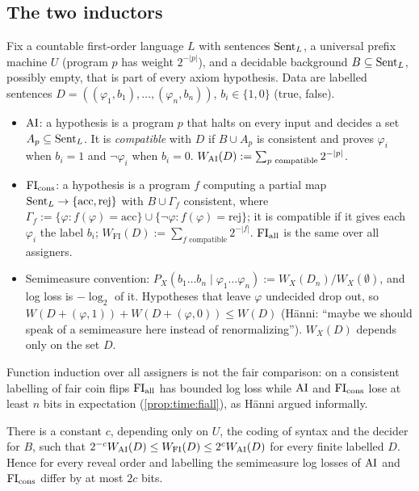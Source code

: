 \subsection{The two inductors}\label{sec:time:inducers}

Fix a countable first-order language $L$ with sentences $\mathrm{Sent}_L$, a universal prefix machine $U$ (program $p$ has weight $2^{-|p|}$), and a decidable background $B\subseteq\mathrm{Sent}_L$, possibly empty, that is part of every axiom hypothesis. Data are labelled sentences $D=((\varphi_1,b_1),\dots,(\varphi_n,b_n))$, $b_i\in\{1,0\}$ (true, false).

\begin{definition}\label{def:time:inducers}
\begin{itemize}[leftmargin=*,itemsep=1pt]
\item $\mathrm{AI}$: a hypothesis is a program $p$ that halts on every input and decides a set $A_p\subseteq\mathrm{Sent}_L$. It is \emph{compatible} with $D$ if $B\cup A_p$ is consistent and proves $\varphi_i$ when $b_i=1$ and $\neg\varphi_i$ when $b_i=0$. $W_{\mathrm{AI}}(D):=\sum_{p\text{ compatible}}2^{-|p|}$.
\item $\mathrm{FI}_{\mathrm{cons}}$: a hypothesis is a program $f$ computing a partial map $\mathrm{Sent}_L\to\{\mathrm{acc},\mathrm{rej}\}$ with $B\cup\Gamma_f$ consistent, where $\Gamma_f:=\{\varphi:f(\varphi)=\mathrm{acc}\}\cup\{\neg\varphi:f(\varphi)=\mathrm{rej}\}$; it is compatible if it gives each $\varphi_i$ the label $b_i$; $W_{\mathrm{FI}}(D):=\sum_{f\text{ compatible}}2^{-|f|}$. $\mathrm{FI}_{\mathrm{all}}$ is the same over all assigners.
\item Semimeasure convention: $P_X(b_1\dots b_n\mid\varphi_1\dots\varphi_n):=W_X(D_n)/W_X(\emptyset)$, and log loss is $-\log_2$ of it. Hypotheses that leave $\varphi$ undecided drop out, so $W(D+(\varphi,1))+W(D+(\varphi,0))\le W(D)$ (H\"anni: ``maybe we should speak of a semimeasure here instead of renormalizing''). $W_X(D)$ depends only on the set $D$.
\end{itemize}
\end{definition}

\noindent Function induction over all assigners is not the fair comparison: on a consistent labelling of fair coin flips $\mathrm{FI}_{\mathrm{all}}$ has bounded log loss while $\mathrm{AI}$ and $\mathrm{FI}_{\mathrm{cons}}$ lose at least $n$ bits in expectation (\cref{prop:time:fiall}), as H\"anni argued informally.

\begin{theorem}\label{thm:time:equiv}
There is a constant $c$, depending only on $U$, the coding of syntax and the decider for $B$, such that $2^{-c}W_{\mathrm{AI}}(D)\le W_{\mathrm{FI}}(D)\le2^{c}W_{\mathrm{AI}}(D)$ for every finite labelled $D$. Hence for every reveal order and labelling the semimeasure log losses of $\mathrm{AI}$ and $\mathrm{FI}_{\mathrm{cons}}$ differ by at most $2c$ bits.
\end{theorem}

